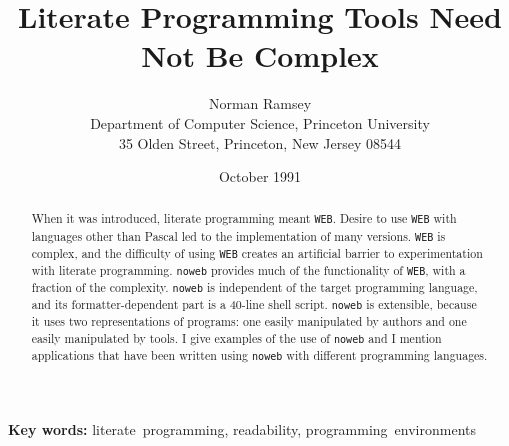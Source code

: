 \title{Literate Programming Tools Need Not Be Complex}
\author{Norman Ramsey\\Department of Computer Science, Princeton University\\
35 Olden Street, Princeton, New Jersey 08544}
\date{October 1991}
\setcounter{secnumdepth}{0}

\makeatletter
\def\refno#1{\nocite{#1}\@ifundefined
       {b@#1}{{\bf ?}\@warning
       {Reference number `#1' on page \thepage \space undefined}}%
{\hbox{\csname b@#1\endcsname}}}
\makeatother

\def\remark#1{\marginpar{\raggedright\hbadness=10000\footnotesize\it #1}}



\maketitle

\begin{abstract}
When it was introduced, literate programming meant {\tt WEB}.
Desire to use {\tt WEB} with languages other than Pascal led to the
implementation of many versions.
{\tt WEB} is complex, and the difficulty of using {\tt WEB} creates
an artificial barrier to
experimentation with literate programming.
 {\tt noweb} provides much of the functionality of
{\tt WEB}, with a fraction of the complexity.
{\tt noweb} is independent of the target programming language, and its
formatter-dependent part is a 40-line shell script. 
{\tt noweb} is extensible, because it uses two
representations of programs: one easily manipulated by authors and one
easily manipulated by tools.
I give examples of the use of {\tt noweb} and I mention
 applications that have been written
using {\tt noweb} with different programming languages.
\end{abstract}

\begin{center}\small
{\bf Key words:}
literate~programming, readability, programming~environments
\end{center}

